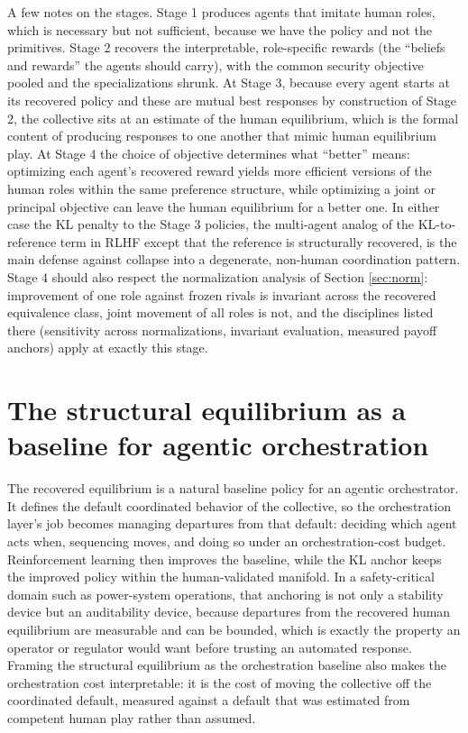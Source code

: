 \documentclass[11pt]{article}
\theoremstyle{definition}
\begin{document}
A few notes on the stages. Stage 1 produces agents that imitate human roles, which is necessary but not sufficient, because we have the policy and not the primitives. Stage 2 recovers the interpretable, role-specific rewards (the ``beliefs and rewards'' the agents should carry), with the common security objective pooled and the specializations shrunk. At Stage 3, because every agent starts at its recovered policy and these are mutual best responses by construction of Stage 2, the collective sits at an estimate of the human equilibrium, which is the formal content of producing responses to one another that mimic human equilibrium play. At Stage 4 the choice of objective determines what ``better'' means: optimizing each agent's recovered reward yields more efficient versions of the human roles within the same preference structure, while optimizing a joint or principal objective can leave the human equilibrium for a better one. In either case the KL penalty to the Stage 3 policies, the multi-agent analog of the KL-to-reference term in RLHF except that the reference is structurally recovered, is the main defense against collapse into a degenerate, non-human coordination pattern. Stage 4 should also respect the normalization analysis of Section \ref{sec:norm}: improvement of one role against frozen rivals is invariant across the recovered equivalence class, joint movement of all roles is not, and the disciplines listed there (sensitivity across normalizations, invariant evaluation, measured payoff anchors) apply at exactly this stage.

\section{The structural equilibrium as a baseline for agentic orchestration}

The recovered equilibrium is a natural baseline policy for an agentic orchestrator. It defines the default coordinated behavior of the collective, so the orchestration layer's job becomes managing departures from that default: deciding which agent acts when, sequencing moves, and doing so under an orchestration-cost budget. Reinforcement learning then improves the baseline, while the KL anchor keeps the improved policy within the human-validated manifold. In a safety-critical domain such as power-system operations, that anchoring is not only a stability device but an auditability device, because departures from the recovered human equilibrium are measurable and can be bounded, which is exactly the property an operator or regulator would want before trusting an automated response. Framing the structural equilibrium as the orchestration baseline also makes the orchestration cost interpretable: it is the cost of moving the collective off the coordinated default, measured against a default that was estimated from competent human play rather than assumed.
\end{document}
